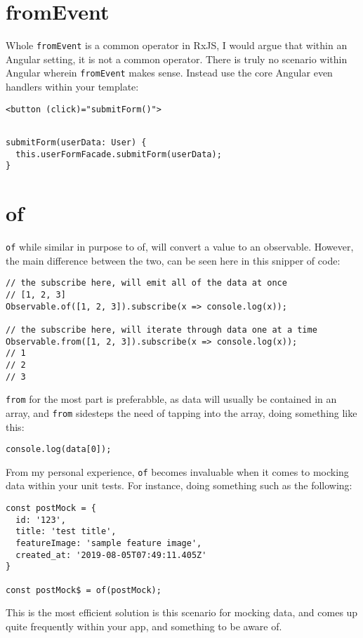 \section{fromEvent}
Whole \lstinline{fromEvent} is a common operator in RxJS, I would argue that within 
an Angular setting, it is not a common operator. There is truly no scenario within 
Angular wherein \lstinline{fromEvent} makes sense. Instead use the core Angular 
even handlers within your template: 

\begin{lstlisting}[caption=user-form.input.ts]
<button (click)="submitForm()">
\end{lstlisting}

\begin{lstlisting}[caption=user-form.component.ts]

submitForm(userData: User) {
  this.userFormFacade.submitForm(userData);
}
\end{lstlisting}

\section{of}
\lstinline{of} while similar in purpose to of, will convert a value to an 
observable. However, the main difference between the two, can be seen here
in this snipper of code:
\begin{lstlisting}
// the subscribe here, will emit all of the data at once  
// [1, 2, 3]
Observable.of([1, 2, 3]).subscribe(x => console.log(x));  

// the subscribe here, will iterate through data one at a time
Observable.from([1, 2, 3]).subscribe(x => console.log(x));  
// 1
// 2
// 3
\end{lstlisting} 

\lstinline{from} for the most part is preferabble, as data will usually 
be contained in an array, and \lstinline{from} sidesteps the need of 
tapping into the array, doing something like this:
\begin{verbatim}
console.log(data[0]);
\end{verbatim}

From my personal experience, \lstinline{of} becomes invaluable when it comes 
to mocking data within your unit tests. For instance, doing something such as
the following: 
\begin{lstlisting}
const postMock = {
  id: '123',
  title: 'test title',
  featureImage: 'sample feature image',
  created_at: '2019-08-05T07:49:11.405Z' 
}

const postMock$ = of(postMock);
\end{lstlisting}

This is the most efficient solution is this scenario for mocking data, and 
comes up quite frequently within your app, and something to be aware of. 


